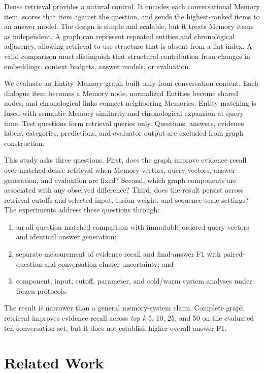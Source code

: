 \documentclass[10pt,twocolumn]{article}
\newcommand{\topk}{\textit{top-k}}
\begin{document}
Dense retrieval provides a natural control. It encodes each conversational
Memory item, scores that item against the question, and sends the
highest-ranked items to an answer model. The design is simple and scalable,
but it treats Memory items as independent. A graph can represent repeated
entities and chronological adjacency, allowing retrieval to use structure
that is absent from a flat index. A valid comparison must distinguish that
structural contribution from changes in embeddings, context budgets, answer
models, or evaluation.

We evaluate an Entity--Memory graph built only from conversation content.
Each dialogue item becomes a Memory node, normalized Entities become shared
nodes, and chronological links connect neighboring Memories. Entity matching
is fused with semantic Memory similarity and chronological expansion at query
time. Test questions form retrieval queries only. Questions, answers, evidence
labels, categories, predictions, and evaluator output are excluded from graph
construction.

This study asks three questions. First, does the graph improve evidence recall
over matched dense retrieval when Memory vectors, query vectors, answer
generation, and evaluation are fixed? Second, which graph components are
associated with any observed difference? Third, does the result persist across
retrieval cutoffs and selected input, fusion-weight, and sequence-scale
settings? The experiments address these questions through:

\begin{enumerate}[label=(\arabic*)]
  \item an all-question matched comparison with immutable ordered query
  vectors and identical answer generation;
  \item separate measurement of evidence recall and final-answer F1 with
  paired-question and conversation-cluster uncertainty; and
  \item component, input, cutoff, parameter, and cold/warm system analyses
  under frozen protocols.
\end{enumerate}

The result is narrower than a general memory-system claim. Complete graph
retrieval improves evidence recall across \topk{} 5, 10, 25, and 50 on the
evaluated ten-conversation set, but it does not establish higher overall
answer F1.

\section{Related Work}
\end{document}
